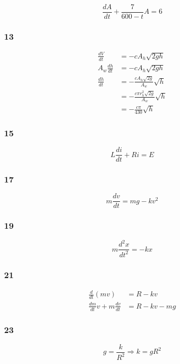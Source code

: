 \documentclass{article}
\begin{document}
\[\frac{dA}{dt} + \frac{7}{600 - t} A = 6\]

\subsubsection{13}

\begin{align*}
  \frac{dV}{dt}     & = -c A_h \sqrt{2 g h}                          \\
  A_w \frac{dh}{dt} & = -c A_h \sqrt{2 g h}                          \\
  \frac{dh}{dt}     & = -\frac{c A_h \sqrt{2 g}}{A_w} \sqrt{h}       \\
                    & = -\frac{c \pi r_h^2 \sqrt{2 g}}{A_w} \sqrt{h} \\
                    & = -\frac{c \pi}{430} \sqrt{h}
\end{align*}

\subsubsection{15}

\[L \frac{di}{dt} + R i = E\]

\subsubsection{17}

\[m \frac{dv}{dt} = m g - k v^2\]

\subsubsection{19}

\[m \frac{d^2 x}{d t^2} = -k x\]

\subsubsection{21}

\begin{align*}
  \frac{d}{d t} (m v)                   & = R - k v       \\
  \frac{d m}{d t} v + m \frac{d v}{d t} & = R - k v - m g
\end{align*}

\subsubsection{23}

\[g = \frac{k}{R^2} \Rightarrow k = g R^2\]
\end{document}
